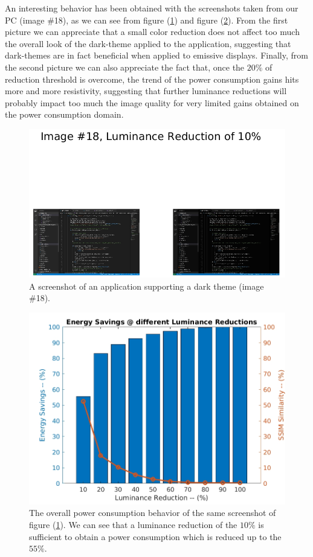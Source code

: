 \documentclass[a4paper]{article}
\begin{document}
            An interesting behavior has been obtained with the screenshots taken from our PC (image \#18), as we can see from figure (\ref{fig:luminance_reduction_10perc_img_18}) and figure (\ref{fig:ImagePercSavingsBar_LUMRED_SSIM_img_18}).
            From the first picture we can appreciate that a small color reduction does not affect too much the overall look of the dark-theme applied to the application, suggesting that dark-themes are in fact beneficial when applied to emissive displays.
            Finally, from the second picture we can also appreciate the fact that, once the $20\%$ of reduction threshold is overcome, the trend of the power consumption gains hits more and more resistivity, suggesting that further luminance reductions will probably impact too much the image quality for very limited gains obtained on the power consumption domain.

            \begin{figure}[htp]
                \centering
                \includegraphics[width=0.6 \columnwidth]{./screenshots/luminance_reduction_10perc_img_18}
                \caption{
                        \label{fig:luminance_reduction_10perc_img_18}
                        A screenshot of an application supporting a dark theme (image \#18). 
                }
            \end{figure}

            \begin{figure}[htp]
                \centering
                \includegraphics[width=0.6 \columnwidth]{./screenshots/ImagePercSavingsBar_LUMRED_SSIM_img_18}
                \caption{
                        \label{fig:ImagePercSavingsBar_LUMRED_SSIM_img_18}
                        The overall power consumption behavior of the same screenshot of figure (\ref{fig:luminance_reduction_10perc_img_18}). We can see that a luminance reduction of the $10\%$ is sufficient to obtain a power consumption which is reduced up to the $55\%$. 
                }
            \end{figure}
\end{document}

